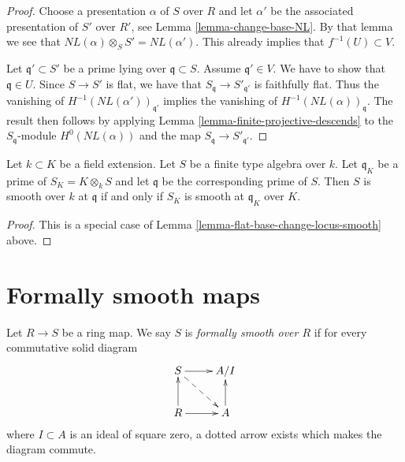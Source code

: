 \begin{proof}
Choose a presentation $\alpha$ of $S$ over $R$ and
let $\alpha'$ be the associated presentation of $S'$
over $R'$, see Lemma \ref{lemma-change-base-NL}.
By that lemma we see that
$NL(\alpha) \otimes_S S' = NL(\alpha')$.
This already implies that $f^{-1}(U) \subset V$.

\medskip\noindent
Let $\mathfrak q' \subset S'$ be a prime lying over
$\mathfrak q \subset S$. Assume $\mathfrak q' \in V$.
We have to show that $\mathfrak q \in U$.
Since $S \to S'$ is flat,
we have that $S_{\mathfrak q} \to S'_{\mathfrak q'}$
is faithfully flat. Thus the vanishing of
$H^{-1}(NL(\alpha'))_{\mathfrak q'}$ implies the
vanishing of $H^{-1}(NL(\alpha))_{\mathfrak q}$.
The result then follows by applying
Lemma \ref{lemma-finite-projective-descends}
to the $S_{\mathfrak q}$-module $H^0(NL(\alpha))$
and the map $S_{\mathfrak q} \to S'_{\mathfrak q'}$.
\end{proof}

\begin{lemma}
\label{lemma-smooth-field-change-local}
Let $k \subset K$ be a field extension.
Let $S$ be a finite type algebra over $k$.
Let $\mathfrak q_K$ be a prime of $S_K = K \otimes_k S$
and let $\mathfrak q$ be the corresponding prime of $S$.
Then $S$ is smooth over $k$ at $\mathfrak q$ if and only if
$S_K$ is smooth at $\mathfrak q_K$ over $K$.
\end{lemma}

\begin{proof}
This is a special case of Lemma \ref{lemma-flat-base-change-locus-smooth}
above.
\end{proof}









\section{Formally smooth maps}
\label{section-formally-smooth}

\begin{definition}
\label{definition-formally-smooth}
Let $R \to S$ be a ring map.
We say $S$ is {\it formally smooth over $R$} if for every
commutative solid diagram
$$
\xymatrix{
S \ar[r] \ar@{-->}[rd] & A/I \\
R \ar[r] \ar[u] & A \ar[u]
}
$$
where $I \subset A$ is an ideal of square zero, a dotted
arrow exists which makes the diagram commute.
\end{definition}

